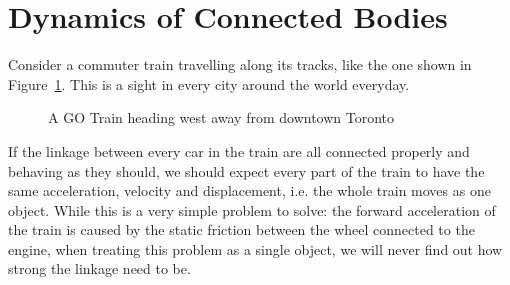 \section{Dynamics of Connected Bodies}
\label{sec:multibody}

Consider a commuter train travelling along its tracks, like the one shown in
Figure~\ref{fig:commuter-train}. This is a sight in every city around the world
everyday. 
\begin{figure}[ht]
  \centering
  \caption{A GO Train heading west away from downtown Toronto}
  \label{fig:commuter-train}
\end{figure}
If the linkage between every car in the train are all connected properly and
behaving as they should, we should expect every part of the train to have the
same acceleration, velocity and displacement, i.e. the whole train moves as one
object. While this is a very simple problem to solve: the forward acceleration
of the train is caused by the static friction between the wheel connected to
the engine, when treating this problem as a single object, we will never find
out how strong the linkage need to be.
%
%





